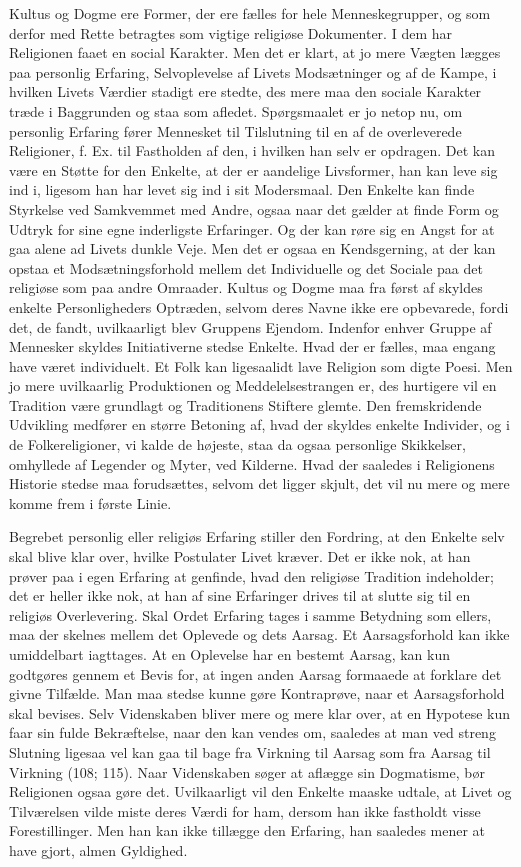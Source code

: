 \documentclass[12pt,a4paper]{book}
\newcommand{\opage}[1]{\marginnote{\footnotesize\textit{[#1]}}}
\newcommand{\apage}[1]{\marginnote{\footnotesize\textit{[#1]}}}
\begin{document}
Kultus og Dogme ere Former, der ere fælles for hele Menneskegrupper, og som derfor med Rette
betragtes som vigtige religiøse Dokumenter. I dem har Religionen faaet en social Karakter.
Men det er klart, at jo mere Vægten lægges paa personlig Erfaring, Selvoplevelse af Livets
Modsætninger og af de Kampe, i hvilken Livets Værdier stadigt ere stedte, des mere maa den
sociale Karakter træde i Baggrunden og staa som afledet. Spørgsmaalet er jo netop nu, om
personlig Erfaring fører Mennesket til Tilslutning til en af de overleverede Religioner, f.
Ex. til Fastholden af den, i hvilken han selv er opdragen. Det kan være en Støtte for den
Enkelte, at der er aandelige Livsformer, han kan leve sig ind i, ligesom han har levet sig
ind i sit Modersmaal. Den Enkelte kan finde Styrkelse ved Samkvemmet \apage{382} med Andre, ogsaa naar
det gælder at finde Form og Udtryk for sine egne inderligste Erfaringer. Og der kan røre sig
en Angst for at gaa alene ad Livets dunkle Veje. Men det er ogsaa en Kendsgerning, at der kan
opstaa et Modsætningsforhold mellem det Individuelle og det Sociale paa det religiøse som paa
andre Omraader. Kultus og Dogme maa fra først af skyldes enkelte Personligheders Optræden,
selvom deres Navne ikke ere opbevarede, fordi det, de fandt, uvilkaarligt blev Gruppens
Ejendom. Indenfor enhver Gruppe af Mennesker skyldes Initiativerne stedse Enkelte. Hvad der
er fælles, maa engang have været individuelt. Et Folk kan ligesaalidt lave Religion som digte Poesi. Men jo mere uvilkaarlig Produktionen og Meddelelsestrangen er, des hurtigere vil en
Tradition være grundlagt og Traditionens Stiftere glemte. Den fremskridende Udvikling
medfører en større Betoning af, hvad der skyldes enkelte Individer, og i de Folkereligioner,
vi kalde de højeste, staa da ogsaa personlige Skikkelser, omhyllede af Legender og Myter,
ved Kilderne. Hvad der saaledes i Religionens Historie stedse maa forudsættes, selvom det
ligger skjult, det vil nu mere og mere komme frem i første Linie.

Begrebet personlig eller religiøs Erfaring stiller den Fordring, at den Enkelte selv skal
blive klar over, hvilke Postulater Livet kræver. Det er ikke nok, at han prøver paa i egen
Erfaring at genfinde, hvad den religiøse Tradition indeholder; det er heller ikke nok, at han
af sine Erfaringer drives til at slutte sig til en religiøs Overlevering. Skal Ordet Erfaring
tages i samme Betydning som ellers, maa der skelnes mellem det Oplevede og dets Aarsag. Et
Aarsagsforhold kan ikke umiddelbart iagttages. At en Oplevelse har en bestemt Aarsag, kan kun
godtgøres gennem et Bevis for, at ingen anden Aarsag formaaede at forklare det givne
Tilfælde. Man maa stedse kunne gøre Kontraprøve, naar et Aarsagsforhold skal bevises. Selv
Videnskaben bliver mere og mere klar over, at en Hypotese kun faar sin fulde Bekræftelse,
naar den kan vendes om, saaledes at man ved streng Slutning ligesaa vel kan gaa til%
\opage{383}bage fra
Virkning til Aarsag som fra Aarsag til Virkning (108; 115). Naar Videnskaben søger at aflægge
sin Dogmatisme, bør Religionen ogsaa gøre det. Uvilkaarligt vil den Enkelte maaske udtale, at
Livet og Tilværelsen vilde miste deres Værdi for ham, dersom han ikke fastholdt visse
Forestillinger. Men han kan ikke tillægge den Erfaring, han saaledes mener at have gjort,
almen Gyldighed.
\end{document}
